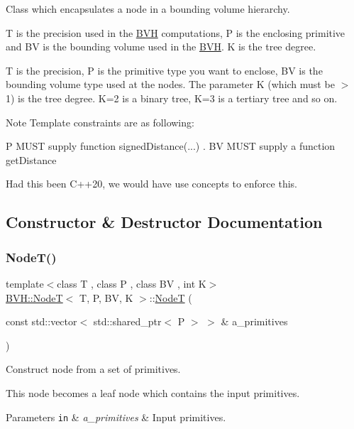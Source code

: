 Class which encapsulates a node in a bounding volume hierarchy.

T is the precision used in the \hyperlink{namespaceBVH}{B\+VH} computations, P is the enclosing primitive and BV is the bounding volume used in the \hyperlink{namespaceBVH}{B\+VH}. K is the tree degree.

T is the precision, P is the primitive type you want to enclose, BV is the bounding volume type used at the nodes. The parameter K (which must be $>$ 1) is the tree degree. K=2 is a binary tree, K=3 is a tertiary tree and so on. \begin{DoxyNote}{Note}
Template constraints are as following\+:
\end{DoxyNote}
P M\+U\+ST supply function signed\+Distance(...) . BV M\+U\+ST supply a function get\+Distance

Had this been C++20, we would have use concepts to enforce this. 

\subsection{Constructor \& Destructor Documentation}
\mbox{\label{classBVH_1_1NodeT_a6da86ccc8e4a0c556cd67ca59af983dc}} 
\subsubsection{\texorpdfstring{Node\+T()}{NodeT()}\hspace{0.1cm}{\footnotesize\ttfamily [1/2]}}
{\footnotesize\ttfamily template$<$class T , class P , class BV , int K$>$ \\
\hyperlink{classBVH_1_1NodeT}{B\+V\+H\+::\+NodeT}$<$ T, P, BV, K $>$\+::\hyperlink{classBVH_1_1NodeT}{NodeT} (\begin{DoxyParamCaption}\item[{const std\+::vector$<$ std\+::shared\+\_\+ptr$<$ P $>$ $>$ \&}]{a\+\_\+primitives }\end{DoxyParamCaption})\hspace{0.3cm}{\ttfamily [inline]}}



Construct node from a set of primitives. 

This node becomes a leaf node which contains the input primitives. 
\begin{DoxyParams}[1]{Parameters}
\mbox{\tt in}  & {\em a\+\_\+primitives} & Input primitives. \\
\hline
\end{DoxyParams}
\mbox{\label{classBVH_1_1NodeT_a6312ce04f70c2e1a860ce380298909b6}} 

